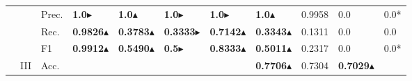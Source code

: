 \begin{tabular}{cclllllllll}
    \multicolumn{1}{l}{}                                                                                       &                                   & Prec.                                                & \textbf{1.0}$\blacktriangleright$             & \textbf{1.0}$\blacktriangle$           & \textbf{1.0}$\blacktriangleright$                  & \textbf{1.0$\blacktriangleright$  }           & \textbf{1.0}$\blacktriangle$                                                                & 0.9958                                                                      & 0.0                                       & 0.0*                                      \\
    \multicolumn{1}{l}{}                                                                                       &                                   & Rec.                                                 & \textbf{0.9826}$\blacktriangle$        & \textbf{0.3783}$\blacktriangle$        & \textbf{0.3333}$\blacktriangleright$               & \textbf{0.7142}$\blacktriangle$        & \textbf{0.3343}$\blacktriangle$                                                             & 0.1311                                                                      & 0.0                                       & 0.0                                       \\
    \multicolumn{1}{l}{}                                                                                       &                                   & F1                                                   & \textbf{0.9912}$\blacktriangle$        & \textbf{0.5490}$\blacktriangle$        & \textbf{0.5}$\blacktriangleright$                  & \textbf{0.8333}$\blacktriangle$        & \textbf{0.5011}$\blacktriangle$                                                             & 0.2317                                                                      & 0.0                                       & 0.0*                                      \\ 
    \cmidrule{2-11}
    \multicolumn{1}{l}{}                                                                                       & \multirow{4}{*}{III}              & Acc.                                                 &                         &                         &                              &                         & \textbf{0.7706}$\blacktriangle$                                                             & 0.7304                                                                      & \textbf{0.7029}$\blacktriangle$                          &                                           \\

\end{tabular}
